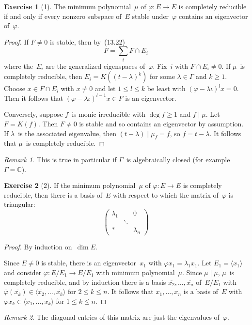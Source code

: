 \documentclass[letterpaper,12pt]{article}
\newcommand{\C}{\mathbb{C}}
\newcommand{\divides}{\mid}
\newcommand{\sect}{\cap}
\newcommand{\gen}[1]{\langle#1\rangle}
\newcommand{\proj}[1]{\overline{#1}}
\theoremstyle{definition}
\newtheorem*{exer}{Exercise}
\theoremstyle{remark}
\newtheorem*{rmk}{Remark}
\begin{document}
\begin{exer}[1]
The minimum polynomial~\(\mu\) of \(\varphi:E\to E\) is completely reducible if and only if every nonzero subspace of~\(E\) stable under~\(\varphi\) contains an eigenvector of~\(\varphi\).
\end{exer}
\begin{proof}
If \(F\ne 0\) is stable, then by~(13.22)
\[F=\sum_i F\sect E_i\]
where the~\(E_i\) are the generalized eigenspaces of~\(\varphi\). Fix~\(i\) with \(F\sect E_i\ne 0\). If \(\mu\)~is completely reducible, then \(E_i=K((t-\lambda)^k)\) for some \(\lambda\in\Gamma\) and \(k\ge 1\). Choose \(x\in F\sect E_i\) with \(x\ne 0\) and let \(1\le l\le k\) be least with \((\varphi-\lambda\iota)^l x=0\). Then it follows that \((\varphi-\lambda\iota)^{l-1}x\in F\) is an eigenvector.

Conversely, suppose \(f\)~is monic irreducible with \(\deg f\ge 1\) and \(f\divides\mu\). Let \(F=K(f)\). Then \(F\ne 0\) is stable and so contains an eigenvector by assumption. If \(\lambda\)~is the associated eigenvalue, then \((t-\lambda)\divides\mu_f=f\), so \(f=t-\lambda\). It follows that \(\mu\)~is completely reducible.
\end{proof}
\begin{rmk}
This is true in particular if \(\Gamma\)~is algebraically closed (for example \(\Gamma=\C\)).
\end{rmk}

\begin{exer}[2]
If the minimum polynomial~\(\mu\) of \(\varphi:E\to E\) is completely reducible, then there is a basis of~\(E\) with respect to which the matrix of~\(\varphi\) is triangular:
\[\begin{pmatrix}
\lambda_1&&0\\
&\ddots&\\
*&&\lambda_n
\end{pmatrix}\]
\end{exer}
\begin{proof}
By induction on~\(\dim E\).

Since \(E\ne 0\) is stable, there is an eigenvector~\(x_1\) with \(\varphi x_1=\lambda_1 x_1\). Let \(E_1=\gen{x_1}\) and consider \(\proj{\varphi}:E/E_1\to E/E_1\) with minimum polynomial~\(\proj{\mu}\). Since \(\proj{\mu}\divides\mu\), \(\proj{\mu}\)~is completely reducible, and by induction there is a basis \(\proj{x_2},\ldots,\proj{x_n}\) of~\(E/E_1\) with \(\proj{\varphi}(\proj{x_k})\in\gen{\proj{x_2},\ldots,\proj{x_k}}\) for \(2\le k\le n\). It follows that \(x_1,\ldots,x_n\) is a basis of~\(E\) with \(\varphi x_k\in\gen{x_1,\ldots,x_k}\) for \(1\le k\le n\).
\end{proof}
\begin{rmk}
The diagonal entries of this matrix are just the eigenvalues of~\(\varphi\).
\end{rmk}
\end{document}
